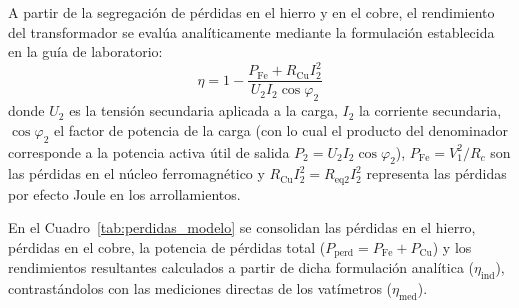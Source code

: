 A partir de la segregación de pérdidas en el hierro y en el cobre, el rendimiento del transformador se evalúa analíticamente mediante la formulación establecida en la guía de laboratorio:
\begin{equation}
    \eta = 1 - \frac{P_{\text{Fe}} + R_{\text{Cu}} I_2^2}{U_2 I_2 \cos\varphi_2}
    \label{eq:eta_formula_guia}
\end{equation}
donde $U_2$ es la tensión secundaria aplicada a la carga, $I_2$ la corriente secundaria, $\cos\varphi_2$ el factor de potencia de la carga (con lo cual el producto del denominador corresponde a la potencia activa útil de salida $P_2 = U_2 I_2 \cos\varphi_2$), $P_{\text{Fe}} = V_1^2 / R_c$ son las pérdidas en el núcleo ferromagnético y $R_{\text{Cu}} I_2^2 = R_{\text{eq2}} I_2^2$ representa las pérdidas por efecto Joule en los arrollamientos.

En el Cuadro~\ref{tab:perdidas_modelo} se consolidan las pérdidas en el hierro, pérdidas en el cobre, la potencia de pérdidas total ($P_{\text{perd}} = P_{\text{Fe}} + P_{\text{Cu}}$) y los rendimientos resultantes calculados a partir de dicha formulación analítica ($\eta_{\text{ind}}$), contrastándolos con las mediciones directas de los vatímetros ($\eta_{\text{med}}$).

